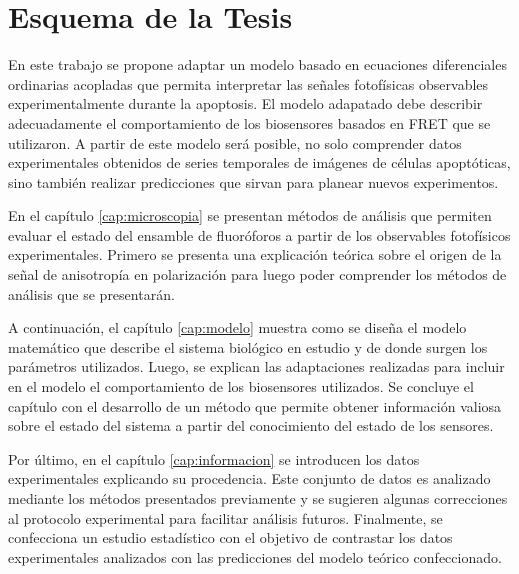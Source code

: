 

\section{Esquema de la Tesis}

En este trabajo se propone adaptar un modelo basado en ecuaciones diferenciales ordinarias acopladas que permita interpretar las señales fotofísicas observables experimentalmente durante la apoptosis. El modelo adapatado debe describir adecuadamente el comportamiento de los biosensores basados en FRET que se utilizaron. A partir de este modelo será posible, no solo comprender datos experimentales obtenidos de series temporales de imágenes de células apoptóticas, sino también realizar predicciones que sirvan para planear nuevos experimentos.

En el capítulo \ref{cap:microscopia} se presentan métodos de análisis que permiten evaluar el estado del ensamble de fluoróforos a partir de los observables fotofísicos experimentales. Primero se presenta una explicación teórica sobre el origen de la señal de anisotropía en polarización para luego poder comprender los métodos de análisis que se presentarán.

A continuación, el capítulo \ref{cap:modelo} muestra como se diseña el modelo matemático que describe el sistema biológico en estudio y de donde surgen los parámetros utilizados. Luego, se explican las adaptaciones realizadas para incluir en el modelo el comportamiento de los biosensores utilizados. Se concluye el capítulo con el desarrollo de un método que permite obtener información valiosa sobre el estado del sistema a partir del conocimiento del estado de los sensores.

Por último, en el capítulo \ref{cap:informacion} se introducen los datos experimentales explicando su procedencia. Este conjunto de datos es analizado mediante los métodos presentados previamente y se sugieren algunas correcciones al protocolo experimental para facilitar análisis futuros. Finalmente, se confecciona un estudio estadístico con el objetivo de contrastar los datos experimentales analizados con las predicciones del modelo teórico confeccionado.